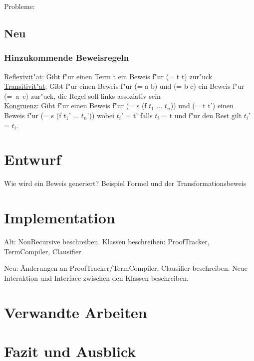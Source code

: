 \documentclass[a4paper]{article}
\begin{document}
Probleme:

\subsection{Neu}

\subsubsection{Hinzukommende Beweisregeln}
\uline{Reflexivit"at}: Gibt f"ur einen Term t ein Beweis f"ur (= t t) zur"uck\\
\uline{Transitivit"at}: Gibt f"ur einen Beweis f"ur (= a b) und (= b c) ein Beweis f"ur \mbox{(= a c)} zur"uck, die Regel soll links assoziativ sein\\
\uline{Kongruenz}: Gibt f"ur einen Beweis f"ur (= s (f $t_1$ ... $t_n$)) und (= t t') einen Beweis f"ur (= s (f $t_1$' ... $t_n$')) wobei $t_i$' = t' falls $t_i$ = t und f"ur den Rest gilt $t_i$' = $t_i$.\\



\section{Entwurf}

Wie wird ein Beweis generiert?
Beispiel Formel und der Transformationsbeweis

\section{Implementation}

Alt:
NonRecursive beschreiben.
Klassen beschreiben: ProofTracker, TermCompiler, Clausifier

Neu:
Änderungen an ProofTracker/TermCompiler, Clausifier beschreiben.
Neue Interaktion und Interface zwischen den Klassen beschreiben.


\section{Verwandte Arbeiten}

\section{Fazit und Ausblick}


\end{document}
